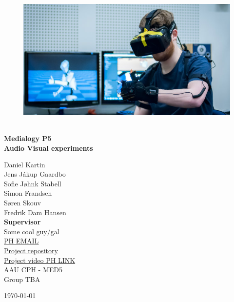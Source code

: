 \begin{titlepage}
			
\addtolength{\voffset}{2cm}

\begin{figure}[H]
\centering
\vspace{2cm}	%
\includegraphics[width=0.99\linewidth]{figure/Frontpage/frontpage.jpg}
\end{figure}

\mbox{}
\vfill
\renewcommand{\familydefault}{\sfdefault} \normalfont %
\HRule\\[0.1cm]
\textbf{{\small Medialogy P5\\ {\Huge Audio Visual experiments}}} \hspace{0.15cm}\\
\HRule\smallskip{}
\begin{multicols}{2}
{\Large Daniel Kartin\\Jens Jákup Gaardbo\\Sofie Jøhnk Stabell\\Simon Frandsen\\Søren Skouv\\Fredrik Dam Hansen\columnbreak}\\
\setlength{\parskip}{2.4cm}
{\Large{\textbf{Supervisor}\\Some cool guy/gal\\\href{mailto:PH EMAIL}{\color{blue}PH EMAIL}}}\medskip\\
\href{https://github.com/jj-gaardbo/medialogyp5code}{\color{blue}Project repository}\\
\href{https://youtu.be/lOfH0zwrcAU}{\color{blue}Project video PH LINK}\medskip
\\\small AAU CPH - 
MED5 \\
Group TBA\\
\end{multicols}
\today
\renewcommand{\familydefault}{\rmdefault} \normalfont %
\end{titlepage}


